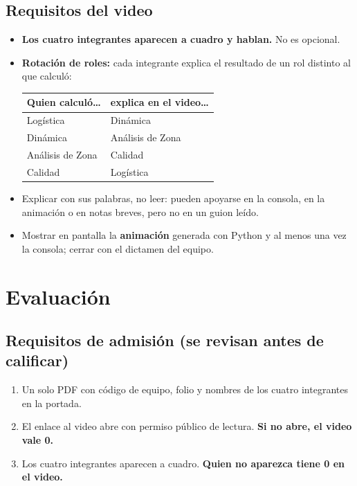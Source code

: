 \documentclass[11pt,letterpaper]{article}
\newcommand{\dest}[1]{\textcolor{accentcolor}{\textbf{#1}}}
\begin{document}
\subsection*{Requisitos del video}
\begin{itemize}
\item \dest{Los cuatro integrantes aparecen a cuadro y hablan.} No es opcional.
\item \textbf{Rotación de roles:} cada integrante explica el resultado de un rol distinto al que calculó:
\begin{center}\small
\begin{tabular}{@{}ll@{}}\toprule
Quien calculó\ldots & explica en el video\ldots \\ \midrule
Logística & Dinámica \\ Dinámica & Análisis de Zona \\ Análisis de Zona & Calidad \\ Calidad & Logística \\ \bottomrule
\end{tabular}\end{center}
\item Explicar con sus palabras, no leer: pueden apoyarse en la consola, en la animación o en notas breves, pero no en un guion leído.
\item Mostrar en pantalla la \textbf{animación} generada con Python y al menos una vez la consola; cerrar con el dictamen del equipo.
\end{itemize}

\section{Evaluación}
\subsection*{Requisitos de admisión (se revisan antes de calificar)}
\begin{enumerate}
\item Un solo PDF con código de equipo, folio y nombres de los cuatro integrantes en la portada.
\item El enlace al video abre con permiso público de lectura. \textbf{Si no abre, el video vale 0.}
\item Los cuatro integrantes aparecen a cuadro. \textbf{Quien no aparezca tiene 0 en el video.}
\end{enumerate}
\end{document}
